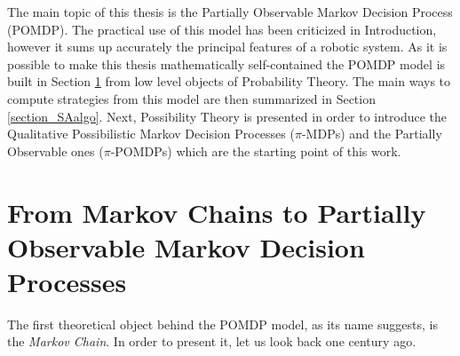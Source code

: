 The main topic of this thesis is the Partially Observable Markov Decision Process (POMDP).
The practical use of this model has been criticized in Introduction, 
however it sums up accurately the principal features of a robotic system.
As it is possible to make this thesis mathematically self-contained
the POMDP model is built in Section \ref{section_Markov2POMDP} 
from low level objects of Probability Theory.
The main ways to compute strategies from this model are then summarized
in Section \ref{section_SAalgo}.
Next, Possibility Theory is presented
in order to introduce the Qualitative Possibilistic Markov Decision Processes ($\pi$-MDPs)
and the Partially Observable ones ($\pi$-POMDPs) which are the starting point
of this work.

\section{From Markov Chains to Partially Observable Markov Decision Processes}
\label{section_Markov2POMDP}
The first theoretical object behind the POMDP model, 
as its name suggests, 
is the \textit{Markov Chain}. 
In order to present it, let us look back one century ago.
